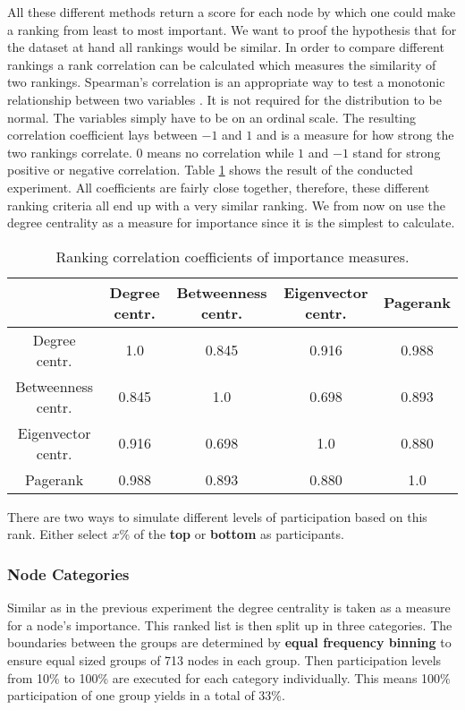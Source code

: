 \documentclass[final]{fhnwreport}       %
\begin{document}
All these different methods return a score for each node by which one could make a ranking from least to most important. We want to proof the hypothesis that for the dataset at hand all rankings would be similar. In order to compare different rankings a rank correlation can be calculated which measures the similarity of two rankings. Spearman's correlation is an appropriate way to test a monotonic relationship between two variables \citep{noauthor_resources_nodate}. It is not required for the distribution to be normal. The variables simply have to be on an ordinal scale. The resulting correlation coefficient lays between $-1$ and $1$ and is a measure for how strong the two rankings correlate. $0$ means no correlation while $1$ and $-1$ stand for strong positive or negative correlation. Table \ref{tab:spearman} shows the result of the conducted experiment. All coefficients are fairly close together, therefore, these different ranking criteria all end up with a very similar ranking. We from now on use the degree centrality as a measure for importance since it is the simplest to calculate.

\begin{table}[H]
\centering
\begin{tabular}{c | cccc} 
{} & {Degree centr.} & {Betweenness centr.} & {Eigenvector centr.} & {Pagerank} \\ \hline 
{Degree centr.} & {1.0} & {0.845} & {0.916} & {0.988} \\ 
{Betweenness centr.} & {0.845} & {1.0} & {0.698} & {0.893}\\
{Eigenvector centr.} & {0.916} & {0.698} & {1.0} & {0.880} \\
{Pagerank} & {0.988} & {0.893} & {0.880} & {1.0} \\
\end{tabular}
\caption{Ranking correlation coefficients of importance measures.}
\label{tab:spearman}
\end{table}

There are two ways to simulate different levels of participation based on this rank. Either select $x\%$ of the \textbf{top} or \textbf{bottom} as participants. 

\subsubsection{Node Categories}\label{subsub:categ}
Similar as in the previous experiment the degree centrality is taken as a measure for a node's importance. This ranked list is then split up in three categories. The boundaries between the groups are determined by \textbf{equal frequency binning} to ensure equal sized groups of 713 nodes in each group. Then participation levels from 10\% to 100\% are executed for each category individually. This means 100\% participation of one group yields in a total of 33\%. 
\end{document}
